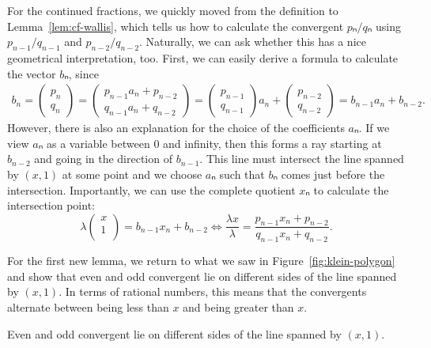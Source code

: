 For the continued fractions, we quickly moved from the definition to Lemma~\ref{lem:cf-wallis},
which tells us how to calculate the convergent $pₙ/qₙ$ using $p_{n-1}/q_{n-1}$ and $p_{n-2}/q_{n-2}$.
Naturally, we can ask whether this has a nice geometrical interpretation, too.
First, we can easily derive a formula to calculate the vector $bₙ$, since
\begin{align*}
  b_n =
  \begin{pmatrix}
    p_n \\ q_n
  \end{pmatrix}
  =
  \begin{pmatrix}
    p_{n-1} a_n + p_{n-2} \\ q_{n-1} a_n + q_{n-2}
  \end{pmatrix}
  =
  \begin{pmatrix}
    p_{n-1} \\ q_{n-1}
  \end{pmatrix}
  a_n
  +
  \begin{pmatrix}
    p_{n-2} \\ q_{n-2}
  \end{pmatrix}
  = b_{n-1} a_n + b_{n-2}.
\end{align*}
However, there is also an explanation for the choice of the coefficients $aₙ$.
If we view $aₙ$ as a variable between $0$ and infinity, then this forms a ray
starting at $b_{n-2}$ and going in the direction of $b_{n-1}$.
This line must intersect the line spanned by $(x, 1)$ at some point
and we choose $aₙ$ such that $bₙ$ comes just before the intersection.
Importantly, we can use the complete quotient $xₙ$ to calculate the intersection point:
\[
  λ
  \begin{pmatrix}
    x \\
    1 \\
  \end{pmatrix}
  =
  b_{n-1} x_n + b_{n-2}
  \iff
  \frac{λ x}{λ} = \frac{p_{n-1} x_n + p_{n-2}}{q_{n-1} x_n + q_{n-2}}.
\]

For the first new lemma, we return to what we saw in
Figure~\ref{fig:klein-polygon} and show that even and odd convergent lie on
different sides of the line spanned by $(x, 1)$.
In terms of rational numbers,
this means that the convergents alternate between being less than $x$ and being
greater than $x$.

\begin{lemma}
  \label{lem:klein-conv}
  Even and odd convergent lie on different sides of the line spanned by $(x, 1)$.
\end{lemma}

